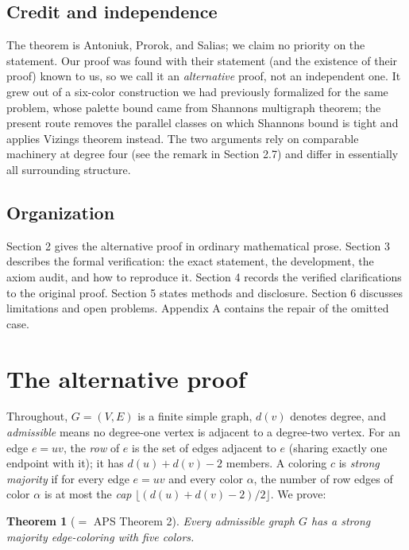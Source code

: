 \documentclass[11pt]{article}
\newtheorem{theorem}{Theorem}[section]
\theoremstyle{definition}
\theoremstyle{remark}
\begin{document}
\subsection{Credit and independence}\label{14-credit-and-independence}

The theorem is Antoniuk, Prorok, and Salia\textquotesingle s; we claim no priority on the statement. Our proof was found with their statement (and the existence of their proof) known to us, so we call it an \emph{alternative} proof, not an independent one. It grew out of a six-color construction we had previously formalized for the same problem, whose palette bound came from Shannon\textquotesingle s multigraph theorem; the present route removes the parallel classes on which Shannon\textquotesingle s bound is tight and applies Vizing\textquotesingle s theorem instead. The two arguments rely on comparable machinery at degree four (see the remark in Section 2.7) and differ in essentially all surrounding structure.

\subsection{Organization}\label{15-organization}

Section 2 gives the alternative proof in ordinary mathematical prose. Section 3 describes the formal verification: the exact statement, the development, the axiom audit, and how to reproduce it. Section 4 records the verified clarifications to the original proof. Section 5 states methods and disclosure. Section 6 discusses limitations and open problems. Appendix A contains the repair of the omitted case.


\section{The alternative proof}\label{2-the-alternative-proof}

Throughout, \(G = (V, E)\) is a finite simple graph, \(d(v)\) denotes degree, and \emph{admissible} means no degree-one vertex is adjacent to a degree-two vertex. For an edge \(e = uv\), the \emph{row} of \(e\) is the set of edges adjacent to \(e\) (sharing exactly one endpoint with it); it has \(d(u) + d(v) - 2\) members. A coloring \(c\) is \emph{strong majority} if for every edge \(e = uv\) and every color \(\alpha\), the number of row edges of color \(\alpha\) is at most the \emph{cap} \(\lfloor (d(u)+d(v)-2)/2 \rfloor\). We prove:

\begin{theorem}[\(=\) APS Theorem 2]
Every admissible graph \(G\) has a strong majority edge-coloring with five colors.
\end{theorem}
\end{document}
